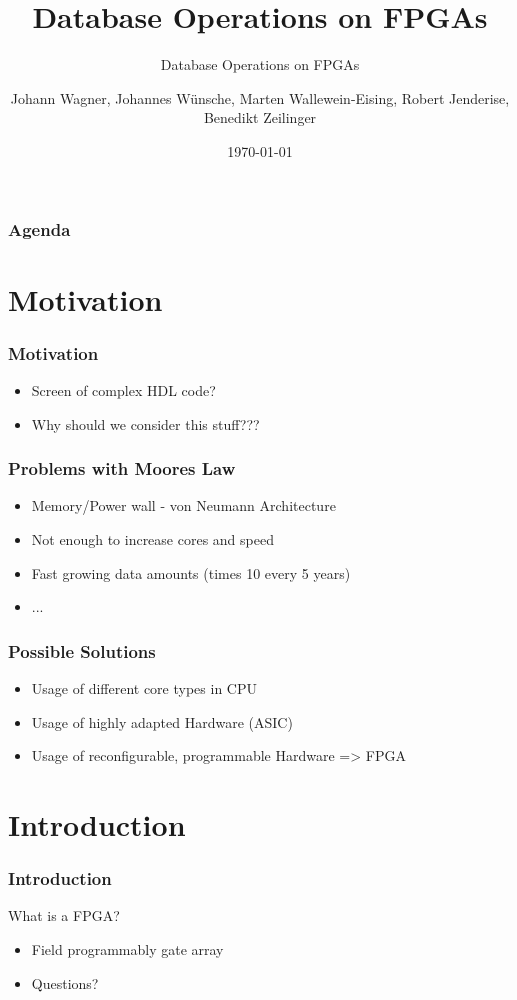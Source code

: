 \documentclass{beamer}
\title{Database Operations on FPGAs}
\subtitle{Database Operations on FPGAs}
\author{Johann Wagner, Johannes Wünsche, Marten Wallewein-Eising, Robert Jenderise, Benedikt Zeilinger}
\date{\today}
\institute{Otto von Guericke University, Magdeburg}
\begin{document}
\begin{frame}[plain]
 \titlepage
\end{frame}

\section[Agenda]{}
\begin{frame}
	\frametitle{Agenda}
	\tableofcontents
\end{frame}

\section{Motivation}
\begin{frame}
	\frametitle{Motivation}
	\begin{itemize}
		\item Screen of complex HDL code?
		\item Why should we consider this stuff???
	\end{itemize}
\end{frame}

\begin{frame}
	\frametitle{Problems with Moores Law}
	\begin{itemize}
		\item Memory/Power wall - von Neumann Architecture
		\item Not enough to increase cores and speed
		\item Fast growing data amounts (times 10 every 5 years)
		\item ...
	\end{itemize}
\end{frame}

\begin{frame}
	\frametitle{Possible Solutions}
	\begin{itemize}
		\item Usage of different core types in CPU
		\item Usage of highly adapted Hardware (ASIC)
		\item Usage of reconfigurable, programmable Hardware => FPGA
	\end{itemize}
\end{frame}

\section{Introduction}
\begin{frame}
	\frametitle{Introduction}
	What is a FPGA?
	\begin{itemize}
		\item Field programmably gate array
		\item Questions?
	\end{itemize}
\end{frame}
\end{document}

